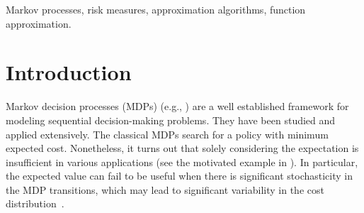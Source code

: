 \documentclass[12pt,technote,onecolumn]{IEEEtran}
\begin{document}
\begin{IEEEkeywords}
Markov processes, risk measures, approximation algorithms, function approximation.
\end{IEEEkeywords}






%
\IEEEpeerreviewmaketitle



\section{Introduction}
% 
% 
% 
% 
Markov decision processes (MDPs) (e.g., \cite{puterman2014markov,bertsekas1996neuro})
are a well established framework for modeling sequential decision-making
problems. They have been studied and applied extensively. The classical MDPs search for a policy with minimum expected cost. Nonetheless, it turns out that solely considering the expectation is insufficient in various applications (see the motivated example in \cite{ruszczynski2010risk}). In particular, the expected value can fail to be useful when there is significant stochasticity in the MDP transitions, which may lead to significant variability in the cost distribution~\cite{howard1972risk}.
\end{document}
